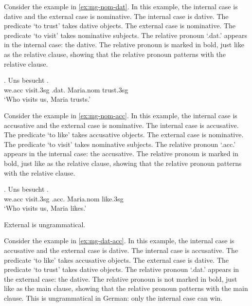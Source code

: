 Consider the example in \ref{ex:mg-nom-dat}. In this example, the internal case is dative and the external case is nominative.
The internal case is dative. The predicate  `to trust' takes dative objects.
The external case is nominative. The predicate  `to visit' takes nominative subjects.
The relative pronoun  `.\ac{dat}.' appears in the internal case: the dative. The relative pronoun is marked in bold, just like as the relative clause, showing that the relative pronoun patterns with the relative clause.

\exg. Uns besucht   .\\
we.\ac{acc} visit.3\ac{sg}\scsub{[nom]} .\ac{dat}. Maria.\ac{nom} trust.3\ac{sg}\scsub{[dat]}\\
`Who visits us, Maria trusts.' \label{ex:mg-nom-dat}

Consider the example in \ref{ex:mg-nom-acc}. In this example, the internal case is accusative and the external case is nominative.
The internal case is accusative. The predicate  `to like' takes accusative objects.
The external case is nominative. The predicate  `to visit' takes nominative subjects.
The relative pronoun  `.\ac{acc}.' appears in the internal case: the accusative. The relative pronoun is marked in bold, just like as the relative clause, showing that the relative pronoun patterns with the relative clause.

\exg. Uns besucht   .\\
 we.\ac{acc} visit.3\ac{sg}\scsub{[nom]} .\ac{acc}. Maria.\ac{nom} like.3\ac{sg}\scsub{[acc]}\\
 `Who visits us, Maria likes.' \label{ex:mg-nom-acc}

External is ungrammatical.

Consider the example in \ref{ex:mg-dat-acc}. In this example, the internal case is accusative and the external case is dative.
The internal case is accusative. The predicate  `to like' takes accusative objects.
The external case is dative. The predicate  `to trust' takes dative objects.
The relative pronoun  `.\ac{dat}.' appears in the external case: the dative. The relative pronoun is not marked in bold, just like as the main clause, showing that the relative pronoun patterns with the main clause.
This is ungrammatical in German: only the internal case can win.

